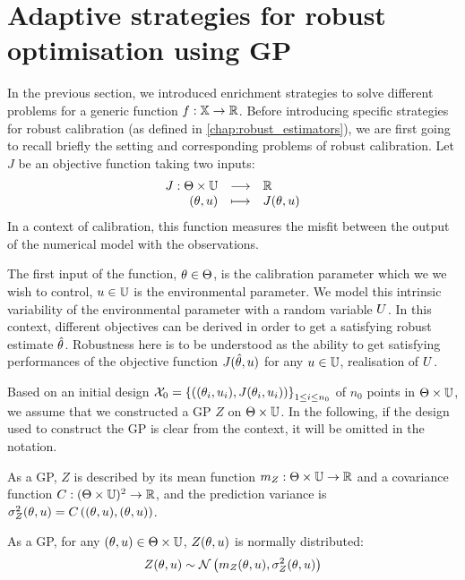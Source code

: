 \documentclass[../../Main_ManuscritThese.tex]{subfiles}
\begin{document}
\section{Adaptive strategies for robust optimisation using GP}
\label{sec:robust_criteria_gp}
In the previous section, we introduced enrichment strategies to solve
different problems for a generic function
$f:\mathbb{X}\rightarrow \mathbb{R}$.  Before introducing specific
strategies for robust calibration (as defined in
\cref{chap:robust_estimators}), we are first going to recall briefly
the setting and corresponding problems of robust calibration.  Let $J$
be an objective function taking two inputs:
\begin{equation}
  \begin{array}{rcl}
    J: \Theta \times \mathbb{U}& \longrightarrow& \mathbb{R} \\
    (\theta, u) & \longmapsto & J(\theta, u)
  \end{array}
\end{equation}
In a context of calibration, this function measures the misfit between the output of the numerical model with the observations.

The first input of the function, $\theta\in\Theta$, is the calibration
parameter which we we wish to control, $u\in\mathbb{U}$ is the
environmental parameter. We model this intrinsic variability of the
environmental parameter with a random variable $U$.  In this
context, different objectives can be derived in order to get a
satisfying robust estimate $\hat{\theta}$. Robustness here is to be understood as
the ability to get satisfying performances of the objective function
$J(\hat{\theta},u)$ for any $u\in\mathbb{U}$, realisation of $U$.

Based on an initial design
$\mathcal{X}_0 = \left\{\left((\theta_i,u_i),J(\theta_i, u_i)
  \right)\right\}_{1\leq i \leq n_0}$ of $n_0$ points in
$\Theta\times\mathbb{U}$, we assume that we constructed a GP $Z$ on
$\Theta \times \mathbb{U}$. In the following, if the design used to
construct the GP is clear from the context, it will be omitted in the
notation.

As a GP, $Z$ is described by its mean function
$m_{Z}:\Theta \times \mathbb{U}\rightarrow\mathbb{R}$ and a covariance
function $C:(\Theta\times\mathbb{U})^2\rightarrow \mathbb{R}$, and the
prediction variance is
$\sigma^2_Z(\theta,u) = C\left((\theta,u), (\theta,u)\right)$.

As a GP, for any $(\theta, u)\in\Theta\times\mathbb{U}$, $Z(\theta, u)$ is normally distributed:
\begin{equation}
  Z(\theta,u) \sim \mathcal{N}\left(m_{Z}(\theta,u), \sigma^2_Z(\theta,u) \right)
\end{equation}
\end{document}
